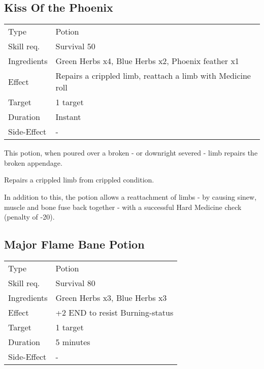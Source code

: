 \documentclass[11pt,a4paper,twocolumn]{book}
\begin{document}
\subsection*{Kiss Of the Phoenix}
{
	\begin{tabu} to 75mm{| X[l,4] | X[l,8] |}
		\hline
		Type 			& Potion 														\\
		Skill req.	    & Survival 50 													\\
		Ingredients     & Green Herbs x4, Blue Herbs x2, Phoenix feather x1				\\
		Effect     		& Repairs a crippled limb, reattach a limb with Medicine roll 	\\
		Target      	& 1 target														\\
		Duration  		& Instant	 													\\
		Side-Effect     & -																\\ \hline
	\end{tabu}
	
}

\medskip

This potion, when poured over a broken - or downright severed - limb repairs the broken appendage.

Repairs a crippled limb from crippled condition.

In addition to this, the potion allows a reattachment of limbs - by causing sinew, muscle and bone fuse back together - with a successful Hard Medicine check (penalty of -20).

\vfill


\subsection*{Major Flame Bane Potion}
{
	\begin{tabu} to 75mm{| X[l,4] | X[l,8] |}
		\hline
		Type 			& Potion 											\\
		Skill req.	    & Survival 80 										\\
		Ingredients     & Green Herbs x3, Blue Herbs x3						\\
		Effect     		& +2 END to resist Burning-status					\\
		Target      	& 1 target											\\
		Duration  		& 5 minutes	 										\\
		Side-Effect     & -													\\ \hline
	\end{tabu}
	
}
\end{document}
